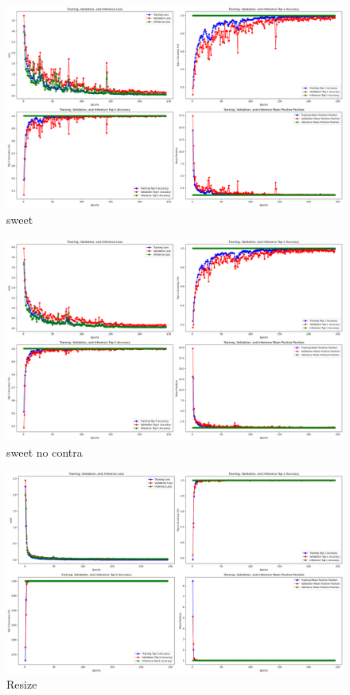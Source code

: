 \begin{figure}[H]
  \centering
  \includegraphics[scale=0.3]{figures/sweet.png} 
  \caption{sweet}
  \label{fig:sweet_64}
\end{figure}

\begin{figure}[H]
  \centering
  \includegraphics[scale=0.3]{figures/sweet_no_contra.png} 
  \caption{sweet no contra}
  \label{fig:sweet_no_contra_64}
\end{figure}

\begin{figure}[H]
  \centering
  \includegraphics[scale=0.3]{figures/Resize_No_contra.png} 
  \caption{Resize}
  \label{fig:Resize_b64}
\end{figure}